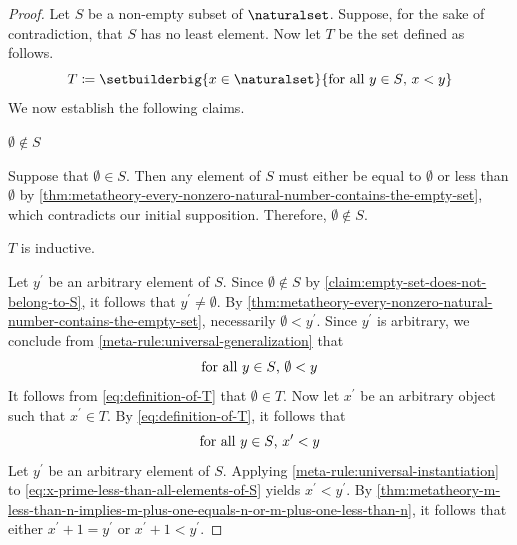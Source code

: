 \begin{proof}
    Let \( S \) be a non-empty subset of \( \naturalset \).
    Suppose, for the sake of contradiction, that \( S \) has no least element.
    Now let \( T \) be the set defined as follows.
    \begin{equation}
        \label{eq:definition-of-T}
        T \coloneq \setbuilderbig{x \in \naturalset}{\text{for all \( y \in S \), \( x < y \)}}
    \end{equation}
    We now establish the following claims.

    \begin{claim}
         \label{claim:empty-set-does-not-belong-to-S}
        \( \emptyset \notin S \)
    \end{claim}

    \noindent
    Suppose that \( \emptyset \in S \).
    Then any element of \( S \) must either be equal to \( \emptyset \) or less than \( \emptyset \)
    by \cref{thm:metatheory-every-nonzero-natural-number-contains-the-empty-set}, which contradicts our initial supposition.
    Therefore, \( \emptyset \notin S \).

    \begin{claim}
         \label{claim:T-is-inductive}
        \( T \) is inductive.
    \end{claim}

    \noindent
    Let \( y^{\prime} \) be an arbitrary element of \( S \).
    Since \( \emptyset \notin S \) by \cref{claim:empty-set-does-not-belong-to-S}, it follows that \( y^{\prime} \neq \emptyset \).
    By \cref{thm:metatheory-every-nonzero-natural-number-contains-the-empty-set}, necessarily \( \emptyset < y^{\prime} \).
    Since \( y^{\prime} \) is arbitrary, we conclude from \cref{meta-rule:universal-generalization} that
    \begin{equation*}
        \text{for all \( y \in S \), \( \emptyset < y \)}
    \end{equation*}
    It follows from \eqref{eq:definition-of-T} that \( \emptyset \in T \).
    Now let \( x^{\prime} \) be an arbitrary object such that \( x^{\prime} \in T \).
    By \eqref{eq:definition-of-T}, it follows that
    \begin{equation}
        \label{eq:x-prime-less-than-all-elements-of-S}
        \text{for all \( y \in S \), \( x^{\prime} < y \)}
    \end{equation}
    Let \( y^{\prime} \) be an arbitrary element of \( S \).
    Applying \cref{meta-rule:universal-instantiation} to \eqref{eq:x-prime-less-than-all-elements-of-S} yields
    \( x^{\prime} < y^{\prime} \).
    By \cref{thm:metatheory-m-less-than-n-implies-m-plus-one-equals-n-or-m-plus-one-less-than-n}, it follows that
    either \( x^{\prime} + 1 = y^{\prime} \) or \( x^{\prime} + 1 < y^{\prime} \).


\end{proof}
